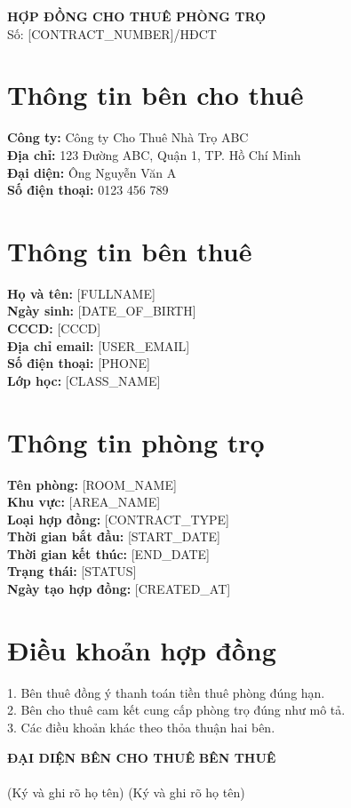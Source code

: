 \documentclass[a4paper,12pt]{article}
\begin{document}
\begin{center}
    {\Large \textbf{HỢP ĐỒNG CHO THUÊ PHÒNG TRỌ}} \\
    \vspace{0.5cm}
    Số: [CONTRACT_NUMBER]/HĐCT
\end{center}

\section*{Thông tin bên cho thuê}
\textbf{Công ty:} Công ty Cho Thuê Nhà Trọ ABC \\
\textbf{Địa chỉ:} 123 Đường ABC, Quận 1, TP. Hồ Chí Minh \\
\textbf{Đại diện:} Ông Nguyễn Văn A \\
\textbf{Số điện thoại:} 0123 456 789 \\

\section*{Thông tin bên thuê}
\textbf{Họ và tên:} [FULLNAME] \\
\textbf{Ngày sinh:} [DATE_OF_BIRTH] \\
\textbf{CCCD:} [CCCD] \\
\textbf{Địa chỉ email:} [USER_EMAIL] \\
\textbf{Số điện thoại:} [PHONE] \\
\textbf{Lớp học:} [CLASS_NAME] \\

\section*{Thông tin phòng trọ}
\textbf{Tên phòng:} [ROOM_NAME] \\
\textbf{Khu vực:} [AREA_NAME] \\
\textbf{Loại hợp đồng:} [CONTRACT_TYPE] \\
\textbf{Thời gian bắt đầu:} [START_DATE] \\
\textbf{Thời gian kết thúc:} [END_DATE] \\
\textbf{Trạng thái:} [STATUS] \\
\textbf{Ngày tạo hợp đồng:} [CREATED_AT] \\

\section*{Điều khoản hợp đồng}
1. Bên thuê đồng ý thanh toán tiền thuê phòng đúng hạn. \\
2. Bên cho thuê cam kết cung cấp phòng trọ đúng như mô tả. \\
3. Các điều khoản khác theo thỏa thuận hai bên.

\begin{flushright}
    \textbf{ĐẠI DIỆN BÊN CHO THUÊ} \hfill \textbf{BÊN THUÊ} \\
    \vspace{2cm} \\
    (Ký và ghi rõ họ tên) \hfill (Ký và ghi rõ họ tên)
\end{flushright}

\end{document}
